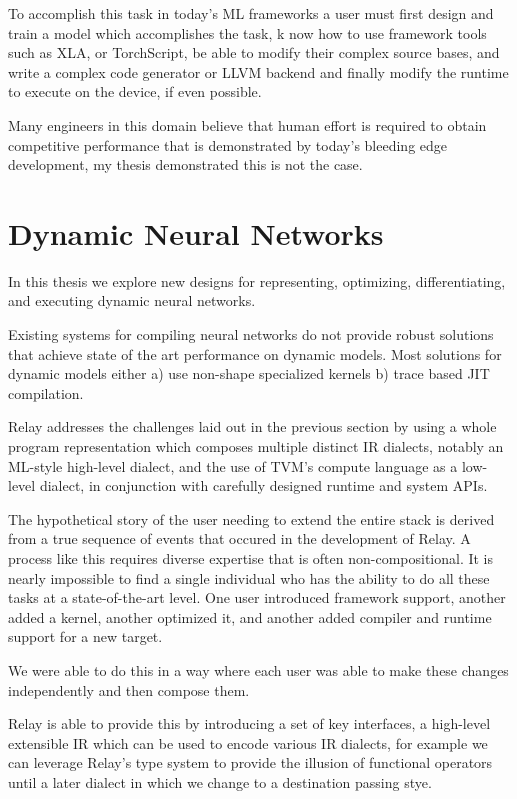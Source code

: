 To accomplish this task in today’s ML frameworks a user must first design and train a model which accomplishes the task, k
now how to use framework tools such as XLA, or TorchScript, be able to modify their complex source bases, and write a complex code generator
or LLVM backend and finally modify the runtime to execute on the device, if even possible.

Many engineers in this domain believe that human effort is required to obtain competitive performance that is demonstrated by today’s bleeding edge development,
my thesis demonstrated this is not the case.

\section{Dynamic Neural Networks}

In this thesis we explore new designs for representing, optimizing, differentiating, and executing dynamic neural networks.

Existing systems for compiling neural networks do not provide robust solutions that achieve state of the art performance
  on dynamic models.
Most solutions for dynamic models either a) use non-shape specialized kernels b) trace based JIT compilation.

Relay addresses the challenges laid out in the previous section by using a whole program representation which composes multiple distinct IR dialects,
  notably an ML-style high-level dialect,
  and the use of TVM’s compute language as a low-level dialect,
  in conjunction with carefully designed runtime and system APIs.

The hypothetical story of the user needing to extend the entire stack is derived from a true sequence of events that occured in the development of Relay.
A process like this requires diverse expertise that is often non-compositional. It is nearly impossible to find a single individual who has the ability
  to do all these tasks at a state-of-the-art level.
One user introduced framework support, another added a kernel, another optimized it, and another added compiler and runtime support for a new target.

We were able to do this in a way where each user was able to make these changes independently and then compose them.

Relay is able to provide this by introducing a set of key interfaces, a high-level extensible IR which can be used to encode various IR dialects,
  for example we can leverage Relay’s type system to provide the illusion of functional operators until a later dialect in which we change
  to a destination passing stye.

